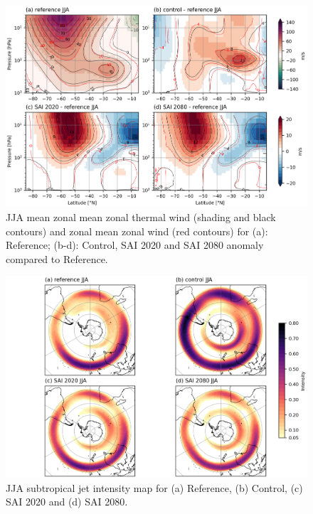 \begin{figure}[H]
	\centering
	\includegraphics[width=0.95\linewidth]{images/UT_U_zmdiff_JJA.png}
	\caption{JJA mean zonal mean zonal thermal wind (shading and black contours) and zonal mean zonal wind (red contours) for (a): Reference; (b-d): Control, SAI 2020 and SAI 2080 anomaly compared to Reference.}
	\label{fig:th_U_zmdiff_JJA}
\end{figure}


\begin{figure}[H]
	\centering
	\includegraphics[width=0.95\linewidth]{images/STJ_map_JJA.png}
	\caption{JJA subtropical jet intensity map for (a) Reference, (b) Control, (c) SAI 2020 and (d) SAI 2080.}
	\label{fig:STJ_map_JJA}
\end{figure}


